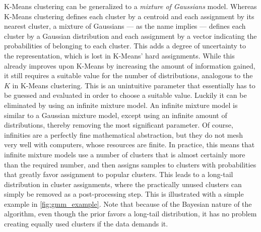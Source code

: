 K-Means clustering can be generalized to a \emph{mixture of Gaussians} model.
Whereas K-Means clustering defines each cluster by a centroid and each
assignment by its nearest cluster, a mixture of Gaussians --- as the name
implies --- defines each cluster by a Gaussian distribution and each
assignment by a vector indicating the probabilities of belonging to each
cluster. This adds a degree of uncertainty to the representation, which is
lost in K-Means' hard assignments. While this already improves upon K-Means by
increasing the amount of information gained, it still requires a suitable
value for the number of distributions, analogous to the $K$ in K-Means
clustering. This is an unintuitive parameter that essentially has to be
guessed and evaluated in order to choose a suitable value. Luckily it can be
eliminated by using an infinite mixture model. An infinite mixture model is
similar to a Gaussian mixture model, except using an infinite amount of
distributions, thereby removing the most significant parameter.  Of course,
infinities are a perfectly fine mathematical abstraction, but they do not mesh
very well with computers, whose resources are finite. In practice, this means
that infinite mixture models use a number of clusters that is almost certainly
more than the required number, and then assigns samples to clusters with
probabilities that greatly favor assignment to popular clusters. This leads to
a long-tail distribution in cluster assignments, where the practically unused
clusters can simply be removed as a post-processing step. This is illustrated
with a simple example in \cref{fig:gmm_example}. Note that because of the
Bayesian nature of the algorithm, even though the prior favors a long-tail
distribution, it has no problem creating equally used clusters if the data
demands it.

